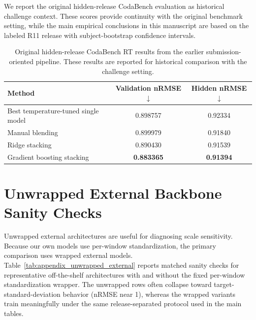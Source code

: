 \documentclass[12pt]{article}
\begin{document}
We report the original hidden-release CodaBench evaluation as historical challenge context. These scores provide continuity with the original benchmark setting, while the main empirical conclusions in this manuscript are based on the labeled R11 release with subject-bootstrap confidence intervals.

\begin{table}[!h]
\centering
\caption{Original hidden-release CodaBench RT results from the earlier submission-oriented pipeline. These results are reported for historical comparison with the challenge setting.}
\label{tab:appendix_codabench}
\small
\setlength{\tabcolsep}{8pt}
\renewcommand{\arraystretch}{1.15}
\begin{tabular}{lcc}
\toprule
\textbf{Method} & \textbf{Validation nRMSE} $\downarrow$ & \textbf{Hidden nRMSE} $\downarrow$ \\
\midrule
Best temperature-tuned single model & 0.898757 & 0.92334 \\
Manual blending & 0.899979 & 0.91840 \\
Ridge stacking & 0.890430 & 0.91539 \\
Gradient boosting stacking & \textbf{0.883365} & \textbf{0.91394} \\
\bottomrule
\end{tabular}
\end{table}

\section{Unwrapped External Backbone Sanity Checks}

Unwrapped external architectures are useful for diagnosing scale sensitivity. Because our own models use per-window standardization, the primary comparison uses wrapped external models. Table~\ref{tab:appendix_unwrapped_external} reports matched sanity checks for representative off-the-shelf architectures with and without the fixed per-window standardization wrapper. The unwrapped rows often collapse toward target-standard-deviation behavior (nRMSE near 1), whereas the wrapped variants train meaningfully under the same release-separated protocol used in the main tables.
\end{document}
